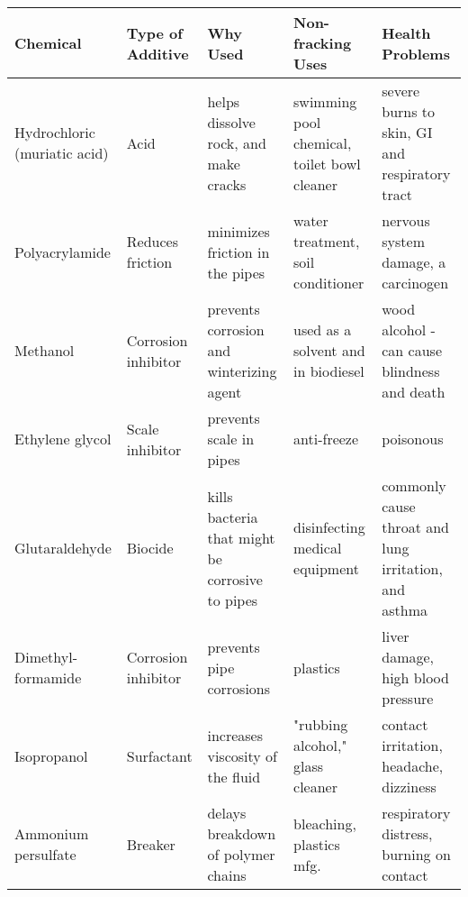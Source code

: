 \documentclass{article}
\begin{document}
\begin{table}[h!]
  \begin{center}
    \begin{tabular}{p{2.5cm} | p{1.7cm} | p{3cm} | p{3.5cm} | p{4.2cm}} %
      \textbf{Chemical} & \textbf{Type of Additive} & \textbf{Why Used}& \textbf{Non-fracking Uses}& \textbf{Health Problems}\\

      \midrule
      Hydrochloric (muriatic acid) & Acid & helps dissolve rock, and make cracks & swimming pool chemical, toilet bowl cleaner & severe burns to skin, GI and respiratory tract\\
      \midrule
      Polyacrylamide & Reduces friction & minimizes friction in the pipes & water treatment, soil conditioner & nervous system damage, a carcinogen\\
      \midrule
      Methanol&Corrosion inhibitor&prevents corrosion and winterizing agent&used as a solvent and in biodiesel&wood alcohol - can cause blindness and death\\
      \midrule
      Ethylene glycol&Scale inhibitor&prevents scale in pipes&anti-freeze&poisonous\\
      \midrule
      Glutaraldehyde&Biocide&kills bacteria that might be corrosive to pipes&disinfecting medical equipment&commonly cause throat and lung irritation, and asthma\\
      \midrule
      Dimethyl-formamide&Corrosion inhibitor&prevents pipe corrosions&plastics&liver damage, high blood pressure\\
      \midrule
      Isopropanol&Surfactant&increases viscosity of the fluid&"rubbing alcohol," glass cleaner&contact irritation, headache, dizziness\\
      \midrule
      Ammonium persulfate&Breaker&delays breakdown of polymer chains&bleaching, plastics mfg.&respiratory distress, burning on contact

    \end{tabular}
  \end{center}
\end{table}
\end{document}
